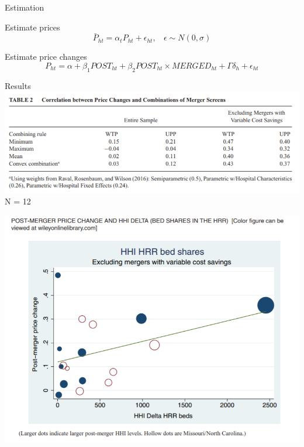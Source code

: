 \documentclass{beamer}
\begin{document}
\begin{frame}{Estimation}

Estimate prices 
$$
\bar{P}_{ht} = \alpha_t P_{ht} + \epsilon_{ht},\ \ \ \ \epsilon \sim N(0,\sigma)
$$


Estimate price changes
$$
P_{ht} = \alpha + \beta_1 POST_{ht} + \beta_2 POST_{ht}\times MERGED_{ht} + \Gamma \delta_h + \epsilon_{ht}
$$


\end{frame}
\begin{frame}{Results}
            \includegraphics[width=\linewidth,height=\textheight,keepaspectratio]{table2.PNG} \\
            N = 12
    
\end{frame}
\begin{frame}
            \includegraphics[width=\linewidth,height=\textheight,keepaspectratio]{hhi1.PNG} \\
    
\end{frame}
\end{document}
